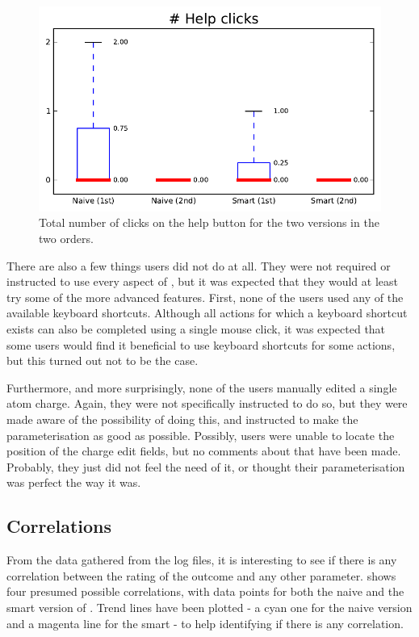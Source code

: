\begin{figure}[h!]
\center
\includegraphics[width=.6\textwidth]{img/graphs/1b_01.pdf}
\caption{Total number of clicks on the help button for the two versions in the two orders.}
\end{figure}

There are also a few things users did not do at all. They were not required or instructed to use every aspect of \oframp, but it was expected that they would at least try some of the more advanced features. First, none of the users used any of the available keyboard shortcuts. Although all actions for which a keyboard shortcut exists can also be completed using a single mouse click, it was expected that some users would find it beneficial to use keyboard shortcuts for some actions, but this turned out not to be the case.

Furthermore, and more surprisingly, none of the users manually edited a single atom charge. Again, they were not specifically instructed to do so, but they were made aware of the possibility of doing this, and instructed to make the parameterisation as good as possible. Possibly, users were unable to locate the position of the charge edit fields, but no comments about that have been made. Probably, they just did not feel the need of it, or thought their parameterisation was perfect the way it was.

\subsection{Correlations}
From the data gathered from the log files, it is interesting to see if there is any correlation between the rating of the outcome and any other parameter.  shows four presumed possible correlations, with data points for both the naive and the smart version of \oframp. Trend lines have been plotted - a cyan one for the naive version and a magenta line for the smart - to help identifying if there is any correlation.

